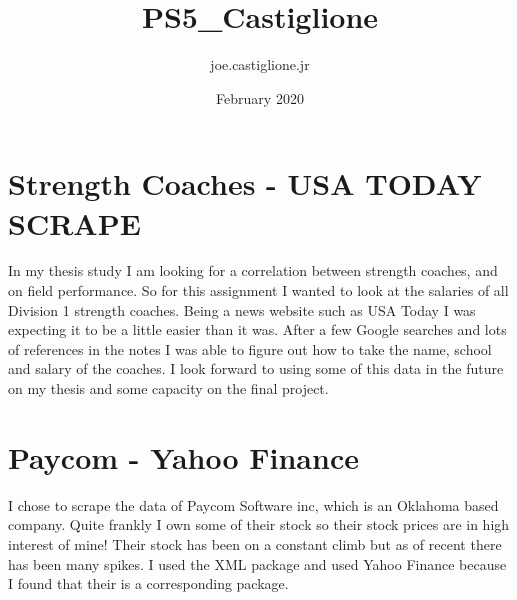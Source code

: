 \documentclass{article}
\title{PS5_Castiglione}
\author{joe.castiglione.jr }
\date{February 2020}
\begin{document}
\maketitle

\section{Strength Coaches - USA TODAY SCRAPE}
In my thesis study I am looking for a correlation between strength coaches, and on field performance. So for this assignment I wanted to look at the salaries of all Division 1 strength coaches. Being a news website such as USA Today I was expecting it to be a little easier than it was. After a few Google searches and lots of references in the notes I was able to figure out how to take the name, school and salary of the coaches. I look forward to using some of this data in the future on my thesis and some capacity on the final project. 
\section{Paycom - Yahoo Finance}
I chose to scrape the data of Paycom Software inc, which is an Oklahoma based company.  Quite frankly I own some of their stock so their stock prices are in high interest of mine! Their stock has been on a constant climb but as of recent there has been many spikes. I used the XML package and used Yahoo Finance because I found that their is a corresponding package. 
\end{document}
